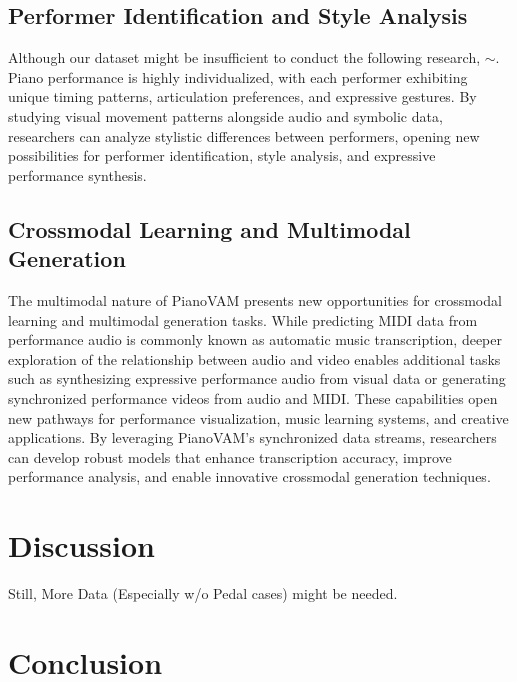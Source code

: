\documentclass{article}
\begin{document}
\subsection{Performer Identification and Style Analysis}\label{subsec:performer_identification}
Although our dataset might be insufficient to conduct the following research, $\sim$.
Piano performance is highly individualized, with each performer exhibiting unique timing patterns, articulation preferences, and expressive gestures. By studying visual movement patterns alongside audio and symbolic data, researchers can analyze stylistic differences between performers, opening new possibilities for performer identification, style analysis, and expressive performance synthesis.

\subsection{Crossmodal Learning and Multimodal Generation}\label{subsec:crossmodal_learning}
The multimodal nature of PianoVAM presents new opportunities for crossmodal learning and multimodal generation tasks. While predicting MIDI data from performance audio is commonly known as automatic music transcription, deeper exploration of the relationship between audio and video enables additional tasks such as synthesizing expressive performance audio from visual data or generating synchronized performance videos from audio and MIDI. These capabilities open new pathways for performance visualization, music learning systems, and creative applications. By leveraging PianoVAM’s synchronized data streams, researchers can develop robust models that enhance transcription accuracy, improve performance analysis, and enable innovative crossmodal generation techniques.
\section{Discussion}\label{sec:discussion}
Still, More Data (Especially w/o Pedal cases) might be needed.

\section{Conclusion}\label{sec:conclusion}

\end{document}
